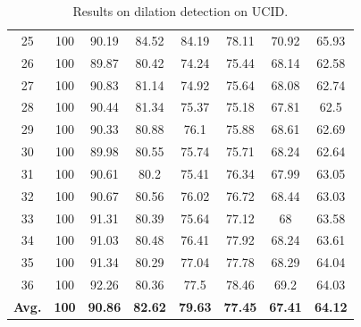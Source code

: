 \documentclass{ieeeaccess}
\begin{document}
\begin{table}[ht!]
\begin{minipage}{0.45\linewidth}
{\begin{tabular}{c|ccccccc}
				25&100&90.19&84.52&84.19&78.11&70.92&65.93\\
				26&100&89.87&80.42&74.24&75.44&68.14&62.58\\
				27&100&90.83&81.14&74.92&75.64&68.08&62.74\\
				28&100&90.44&81.34&75.37&75.18&67.81&62.5\\
				29&100&90.33&80.88&76.1&75.88&68.61&62.69\\
				30&100&89.98&80.55&75.74&75.71&68.24&62.64\\
				31&100&90.61&80.2&75.41&76.34&67.99&63.05\\
				32&100&90.67&80.56&76.02&76.72&68.44&63.03\\
				33&100&91.31&80.39&75.64&77.12&68&63.58\\
				34&100&91.03&80.48&76.41&77.92&68.24&63.61\\
				35&100&91.34&80.29&77.04&77.78&68.29&64.04\\
				36&100&92.26&80.36&77.5&78.46&69.2&64.03\\
				\hline
				\textbf{Avg.}&\textbf{100}&\textbf{90.86}&\textbf{82.62}&\textbf{79.63}&\textbf{77.45}&\textbf{67.41}&\textbf{64.12}\\
				\hline\hline	
		\end{tabular}}
	\end{minipage}
	\hspace{0.5cm}
	\begin{minipage}{0.45\linewidth}
		\centering
		\caption{Results on dilation detection on UCID.}
		\label{table:uciddilation}
\end{minipage}
\end{table}
\end{document}
